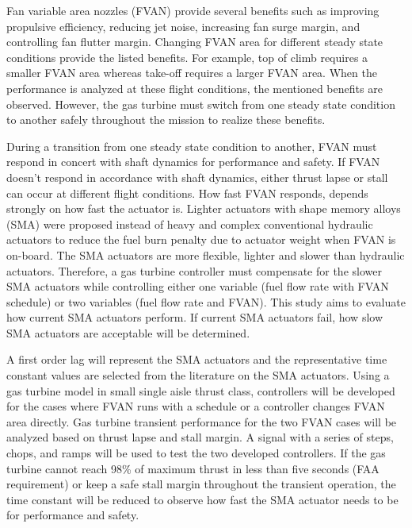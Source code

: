 Fan variable area nozzles (FVAN) provide several benefits such as improving propulsive efficiency, reducing jet noise, increasing fan surge margin, and controlling fan flutter margin. Changing FVAN area for different steady state conditions provide the listed benefits. For example, top of climb requires a smaller FVAN area whereas take-off requires a larger FVAN area. When the performance is analyzed at these flight conditions, the mentioned benefits are observed. However, the gas turbine must switch from one steady state condition to another safely throughout the mission to realize these benefits. 

During a transition from one steady state condition to another, FVAN must respond in concert with shaft dynamics for performance and safety. If FVAN doesn't respond in accordance with shaft dynamics, either thrust lapse or stall can occur at different flight conditions. How fast FVAN responds, depends strongly on how fast the actuator is. Lighter actuators with shape memory alloys (SMA) were proposed instead of heavy and complex conventional hydraulic actuators to reduce the fuel burn penalty due to actuator weight when FVAN is on-board. The SMA actuators are more flexible, lighter and slower than hydraulic actuators. Therefore, a gas turbine controller must compensate for the slower SMA actuators while controlling either one variable (fuel flow rate with FVAN schedule) or two variables (fuel flow rate and FVAN). This study aims to evaluate how current SMA actuators perform. If current SMA actuators fail, how slow SMA actuators are acceptable will be determined.

A first order lag will represent the SMA actuators and the representative time constant values are selected from the literature on the SMA actuators. Using a gas turbine model in small single aisle thrust class, controllers will be developed for the cases where FVAN runs with a schedule or a controller changes FVAN area directly. Gas turbine transient performance for the two FVAN cases will be analyzed based on thrust lapse and stall margin. A signal with a series of steps, chops, and ramps will be used to test the two developed controllers. If the gas turbine cannot reach 98\% of maximum thrust in less than five seconds (FAA requirement) or keep a safe stall margin throughout the transient operation, the time constant will be reduced to observe how fast the SMA actuator needs to be for performance and safety.